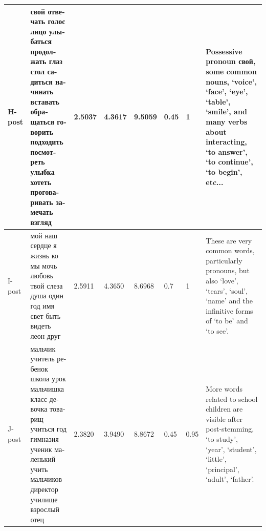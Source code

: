 \documentclass[11pt,a4paper]{article}
\begin{document}
\begin{landscape}
\begin{center}
\begin{tabularx}{\textwidth}{|l|X|l|l|l|l|l|X|}
    H-post & \foreignlanguage{russian}{свой отвечать голос лицо улыбаться продолжать глаз стол садиться начинать вставать обращаться говорить подходить посмотреть улыбка хотеть проговаривать замечать взгляд } & 2.5037 & 4.3617 & 9.5059 & 0.45 & 1 & Possessive pronoun \foreignlanguage{russian}{свой}, some common nouns, `voice', `face', `eye', `table', `smile', and many verbs about interacting, `to answer', `to continue', `to begin', etc...\\ \hline
    I-post & \foreignlanguage{russian}{мой наш сердце я жизнь ко мы мочь любовь твой слеза душа один год имя свет быть видеть леон друг} & 2.5911 & 4.3650 & 8.6968 &  0.7 & 1 & These are very common words, particularly pronouns, but also `love', `tears', `soul', `name' and the infinitive forms of `to be' and `to see'.\\ \hline
    J-post & \foreignlanguage{russian}{мальчик учитель ребенок школа урок мальчишка класс девочка товарищ учиться год гимназия ученик маленький учить мальчиков директор училище взрослый отец} & 2.3820 & 3.9490 & 8.8672 & 0.45 & 0.95 & More words related to school children are visible after post-stemming, `to study', `year', `student', `little', `principal', `adult', `father'. \\ \hline
    \end{tabularx}
\end{center}
\pagebreak


\end{landscape}
\end{document}
